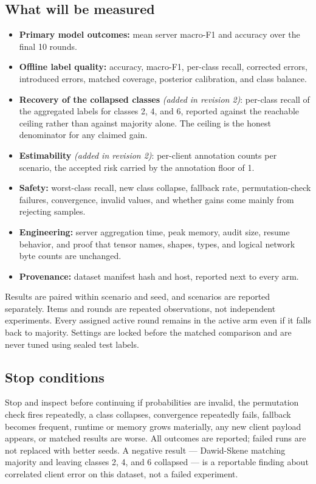 \documentclass[10pt,a4paper]{article}
\begin{document}
\subsection{What will be measured}

\begin{itemize}
  \item \textbf{Primary model outcomes:} mean server macro-F1 and accuracy over the final 10 rounds.
  \item \textbf{Offline label quality:} accuracy, macro-F1, per-class recall, corrected errors,
        introduced errors, matched coverage, posterior calibration, and class balance.
  \item \textbf{Recovery of the collapsed classes} \textit{(added in revision 2)}: per-class recall of
        the aggregated labels for classes 2, 4, and 6, reported against the reachable ceiling rather
        than against majority alone. The ceiling is the honest denominator for any claimed gain.
  \item \textbf{Estimability} \textit{(added in revision 2)}: per-client annotation counts per
        scenario, the accepted risk carried by the annotation floor of 1.
  \item \textbf{Safety:} worst-class recall, new class collapse, fallback rate, permutation-check
        failures, convergence, invalid values, and whether gains come mainly from rejecting samples.
  \item \textbf{Engineering:} server aggregation time, peak memory, audit size, resume behavior, and
        proof that tensor names, shapes, types, and logical network byte counts are unchanged.
  \item \textbf{Provenance:} dataset manifest hash and host, reported next to every arm.
\end{itemize}

Results are paired within scenario and seed, and scenarios are reported separately. Items and rounds
are repeated observations, not independent experiments. Every assigned active round remains in the
active arm even if it falls back to majority. Settings are locked before the matched comparison and
are never tuned using sealed test labels.

\subsection{Stop conditions}

Stop and inspect before continuing if probabilities are invalid, the permutation check fires
repeatedly, a class collapses, convergence repeatedly fails, fallback becomes frequent, runtime or
memory grows materially, any new client payload appears, or matched results are worse. All outcomes
are reported; failed runs are not replaced with better seeds. A negative result --- Dawid-Skene
matching majority and leaving classes 2, 4, and 6 collapsed --- is a reportable finding about
correlated client error on this dataset, not a failed experiment.
\end{document}
